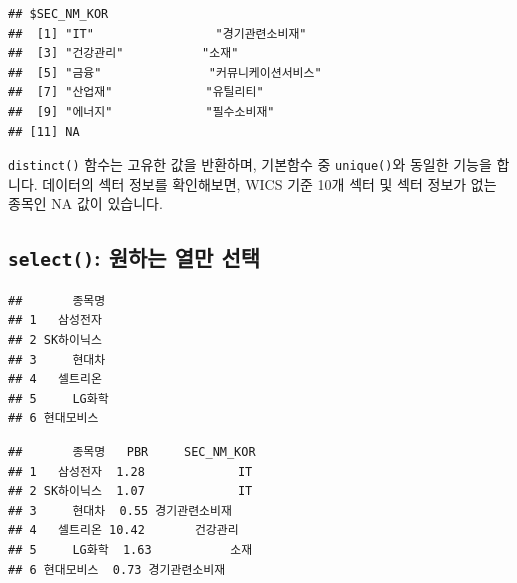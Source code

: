 \documentclass[12pt,]{book}
\newenvironment{Shaded}{\begin{snugshade}}{\end{snugshade}}
\newcommand{\DataTypeTok}[1]{\textcolor[rgb]{0.13,0.29,0.53}{#1}}
\newcommand{\KeywordTok}[1]{\textcolor[rgb]{0.13,0.29,0.53}{\textbf{#1}}}
\newcommand{\NormalTok}[1]{#1}
\newcommand{\OperatorTok}[1]{\textcolor[rgb]{0.81,0.36,0.00}{\textbf{#1}}}
\newcommand{\StringTok}[1]{\textcolor[rgb]{0.31,0.60,0.02}{#1}}
\begin{document}
\begin{verbatim}
## $SEC_NM_KOR
##  [1] "IT"                 "경기관련소비재"    
##  [3] "건강관리"           "소재"              
##  [5] "금융"               "커뮤니케이션서비스"
##  [7] "산업재"             "유틸리티"          
##  [9] "에너지"             "필수소비재"        
## [11] NA
\end{verbatim}

\texttt{distinct()} 함수는 고유한 값을 반환하며, 기본함수 중 \texttt{unique()}와 동일한 기능을 합니다. 데이터의 섹터 정보를 확인해보면, WICS 기준 10개 섹터 및 섹터 정보가 없는 종목인 NA 값이 있습니다.

\hypertarget{select---}{%
\subsection{\texorpdfstring{\texttt{select()}: 원하는 열만 선택}{select(): 원하는 열만 선택}}\label{select---}}

\begin{Shaded}
\end{Shaded}

\begin{verbatim}
##       종목명
## 1   삼성전자
## 2 SK하이닉스
## 3     현대차
## 4   셀트리온
## 5     LG화학
## 6 현대모비스
\end{verbatim}

\begin{Shaded}
\end{Shaded}

\begin{verbatim}
##       종목명   PBR     SEC_NM_KOR
## 1   삼성전자  1.28             IT
## 2 SK하이닉스  1.07             IT
## 3     현대차  0.55 경기관련소비재
## 4   셀트리온 10.42       건강관리
## 5     LG화학  1.63           소재
## 6 현대모비스  0.73 경기관련소비재
\end{verbatim}
\end{document}
